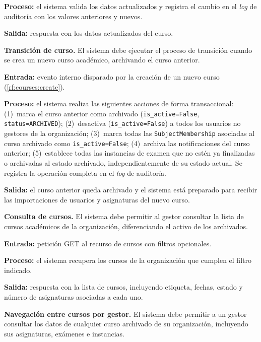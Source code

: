 \begin{functional}
    \textbf{Proceso:} el sistema valida los datos actualizados y registra el cambio en el
    \textit{log} de auditoría con los valores anteriores y nuevos.

    \textbf{Salida:} respuesta con los datos actualizados del curso.

    \item \textbf{Transición de curso.} \label{rf:courses:transition}
    El sistema debe ejecutar el proceso de transición cuando se crea un nuevo curso
    académico, archivando el curso anterior.

    \textbf{Entrada:} evento interno disparado por la creación de un nuevo curso
    (\cref{rf:courses:create}).

    \textbf{Proceso:} el sistema realiza las siguientes acciones de forma transaccional:
    (1)~marca el curso anterior como archivado (\texttt{is\_active=False},
    \texttt{status=ARCHIVED}); (2)~desactiva (\texttt{is\_active=False}) a todos los
    usuarios no gestores de la organización; (3)~marca todas las
    \texttt{SubjectMembership} asociadas al curso archivado como
    \texttt{is\_active=False}; (4)~archiva las notificaciones del curso anterior;
    (5)~establece todas las instancias de examen que no estén ya finalizadas o archivadas
    al estado archivado, independientemente de su estado actual. Se registra la operación
    completa en el \textit{log} de auditoría.

    \textbf{Salida:} el curso anterior queda archivado y el sistema está preparado para
    recibir las importaciones de usuarios y asignaturas del nuevo curso.

    \item \textbf{Consulta de cursos.} \label{rf:courses:list}
    El sistema debe permitir al gestor consultar la lista de cursos académicos de la
    organización, diferenciando el activo de los archivados.

    \textbf{Entrada:} petición GET al recurso de cursos con filtros opcionales.

    \textbf{Proceso:} el sistema recupera los cursos de la organización que cumplen el
    filtro indicado.

    \textbf{Salida:} respuesta con la lista de cursos, incluyendo etiqueta, fechas, estado
    y número de asignaturas asociadas a cada uno.

    \item \textbf{Navegación entre cursos por gestor.} \label{rf:courses:navigate}
    El sistema debe permitir a un gestor consultar los datos de cualquier curso archivado
    de su organización, incluyendo sus asignaturas, exámenes e instancias.


\end{functional}
